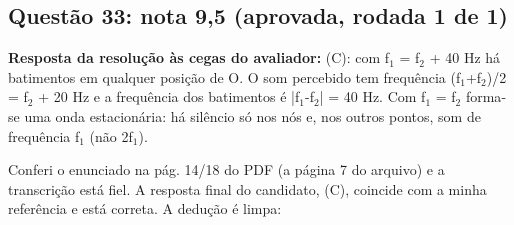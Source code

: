 \documentclass{article}%
\begin{document}
\subsection*{Questão 33: nota 9,5 (aprovada, rodada 1 de 1)}%
\textbf{Resposta da resolução às cegas do avaliador:} (C): com f$_{1}$ = f$_{2}$ + 40 Hz há batimentos em qualquer posição de O. O som percebido tem frequência (f$_{1}$+f$_{2}$)/2 = f$_{2}$ + 20 Hz e a frequência dos batimentos é |f$_{1}$-f$_{2}$| = 40 Hz. Com f$_{1}$ = f$_{2}$ forma{-}se uma onda estacionária: há silêncio só nos nós e, nos outros pontos, som de frequência f$_{1}$ (não 2f$_{1}$).\par %
Conferi o enunciado na pág. 14/18 do PDF (a página 7 do arquivo) e a transcrição está fiel. A resposta final do candidato, (C), coincide com a minha referência e está correta.\newline%
\newline%
A dedução é limpa:\newline%
\end{document}
